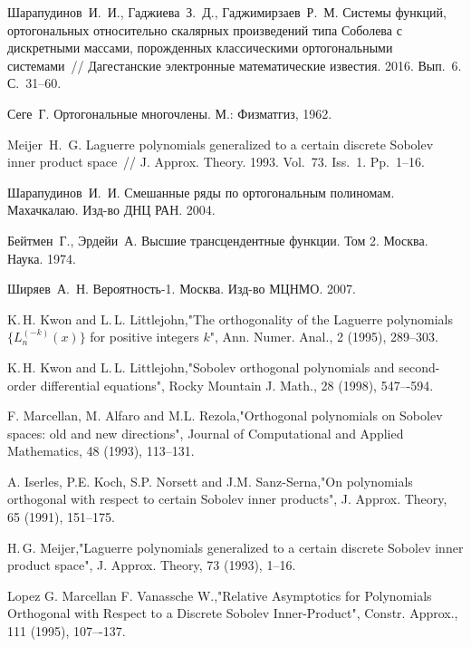 \begin{thebibliography}{20}
{Шарапудинов~И.~И., Гаджиева~З.~Д., Гаджимирзаев~Р.~М.} Системы функций, ортогональных относительно скалярных произведений типа Соболева с дискретными массами, порожденных классическими ортогональными системами~// Дагестанские электронные математические известия. 2016. Вып.~6. С.~31--60.


{Сеге~Г.} Ортогональные многочлены. М.: Физматгиз, 1962.

Meijer~H.~G. Laguerre polynomials generalized to a certain discrete Sobolev inner product space~// J. Approx. Theory. 1993. Vol.~73. Iss.~1. Pp.~1--16.

Шарапудинов~И.~И. Смешанные ряды по ортогональным полиномам. Махачкалаю. Изд-во ДНЦ РАН. 2004.

Бейтмен~Г., Эрдейи~А. Высшие трансцендентные функции. Том 2. Москва. Наука. 1974.

Ширяев~А.~Н. Вероятность-1. Москва. Изд-во МЦНМО. 2007.

K.\,H. Kwon and L.\,L. Littlejohn,"The orthogonality of the Laguerre polynomials $\{L_n^{(-k)}(x)\}$ for positive integers $k$", Ann. Numer. Anal., 2 (1995), 289--303.

K.\,H. Kwon and L.\,L. Littlejohn,"Sobolev orthogonal polynomials and second-order differential equations", Rocky Mountain J. Math., 28 (1998), 547–-594.

F. Marcellan, M. Alfaro and M.L. Rezola,"Orthogonal polynomials on Sobolev spaces: old and new directions", Journal of Computational and Applied Mathematics, 48 (1993), 113--131.

A. Iserles, P.E. Koch, S.P. Norsett and J.M. Sanz-Serna,"On polynomials  orthogonal  with respect  to certain Sobolev inner products", J. Approx. Theory, 65 (1991), 151--175.

H.\,G. Meijer,"Laguerre polynomials generalized to a certain discrete Sobolev inner product space", J. Approx. Theory, 73 (1993), 1--16.

Lopez G. Marcellan F. Vanassche W.,"Relative Asymptotics for Polynomials Orthogonal with Respect to a Discrete Sobolev Inner-Product", Constr. Approx., 111 (1995), 107–-137.


\end{thebibliography}
